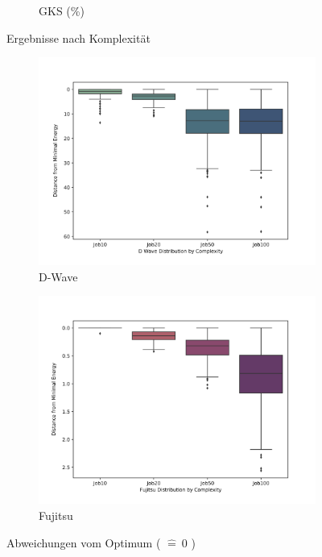 \documentclass[twoside,twocolumn]{article}
\begin{document}
\begin{figure}[H]
\begin{subfigure}[b]{0.49\textwidth}
            \caption[]%
            {{\small GKS (\%)}}    
            \label{fig:GKS}
        \end{subfigure}
        \caption[ Ergebnisse nach Komplexität ]
         {\small Ergebnisse nach Komplexität} 
        \label{fig:A}
    \end{figure}
    \vspace{-15pt}
\begin{figure}[H]
        \centering
        \begin{subfigure}[b]{0.49\textwidth}
            \centering
            \includegraphics[trim={0 0.7cm 0 1.7cm}, clip,width=\textwidth]{images/D Wave Deviation.png}
            \caption[]%
            {{\small D-Wave  }}    
            \label{fig:DeviationDWave}
        \end{subfigure}
        \begin{subfigure}[b]{0.49\textwidth}  
            \centering 
            \includegraphics[trim={0 0.7cm 0 1.7cm}, clip,width=\textwidth]{images/Fujitsu Deviation.png}
            \caption[]%
            {{\small Fujitsu }}    
            \label{fig:DeviationFujitsu}
        \end{subfigure}
        \caption[ Ergebnisse nach Komplexität ]
         {\small  Abweichungen vom Optimum ( $\widehat{=}~0$ ) } 
        \label{fig:B}
    \end{figure}
\end{document}
